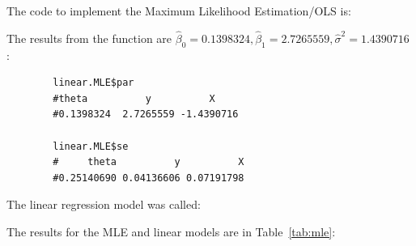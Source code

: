\documentclass[12pt,letterpaper]{article}
\begin{document}
	\clearpage

	The code to implement the Maximum Likelihood Estimation/OLS is:


	The results from the function are $\hat\beta_0 = 0.1398324, \hat\beta_1 = 2.7265559, \hat\sigma^2 = 1.4390716$ :

	\begin{lstlisting}
		linear.MLE$par
		#theta          y          X
		#0.1398324  2.7265559 -1.4390716

		linear.MLE$se
		#     theta          y          X
		#0.25140690 0.04136606 0.07191798
	\end{lstlisting}

	The linear regression model was called:




	The results for the MLE and linear models are in Table~\ref{tab:mle}:
\end{document}
